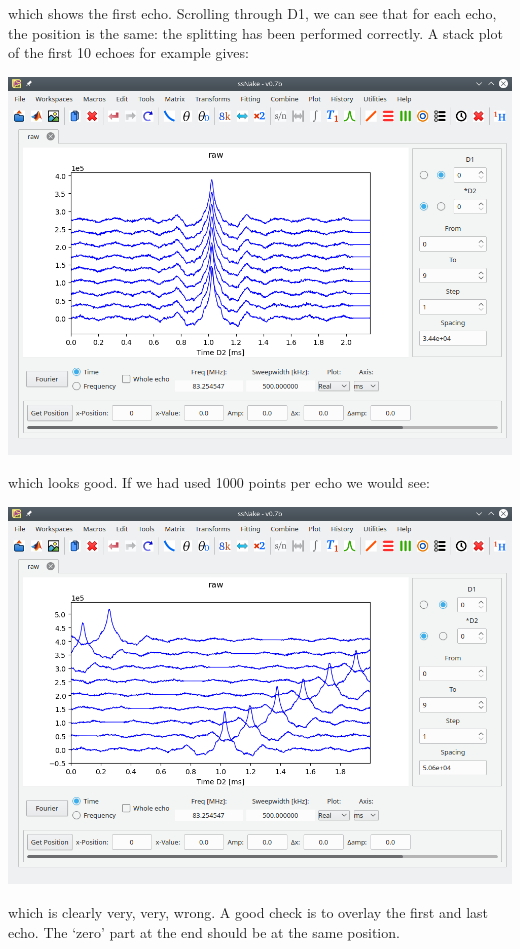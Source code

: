 \documentclass[11pt,a4paper]{article}
\begin{document}
which shows the first echo. Scrolling through D1, we can see that for each echo, the position is the
same: the splitting has been performed correctly. A stack plot of the first 10 echoes for example
gives:
\begin{center}
\includegraphics[width=0.7\linewidth]{Figs/Fig3.png}
\end{center}
which looks good. If we had used 1000 points per echo we would see:
\begin{center}
\includegraphics[width=0.7\linewidth]{Figs/Fig4.png}
\end{center}
which is clearly very, very, wrong. A good check is to overlay the first and last echo. The `zero'
part at the end should be at the same position.
\end{document}
